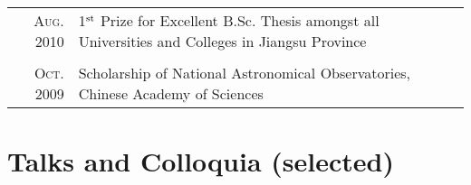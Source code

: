 \documentclass[letterpaper,11pt]{article}
\newcommand{\narrow}{-1.8ex}
\begin{document}
\begin{tabular}{r|p{5.6in}}
    \textsc{Aug. 2010} & 1$^{\rm st}$ Prize for Excellent B.Sc. Thesis amongst all Universities and Colleges in Jiangsu Province   \\
    \multicolumn{2}{c}{} \\[\narrow]
    \textsc{Oct. 2009} & Scholarship of National Astronomical Observatories, Chinese Academy of Sciences   \\
\end{tabular}

\section{Talks and Colloquia (selected)}
\vspace{-0.5em}
\end{document}
